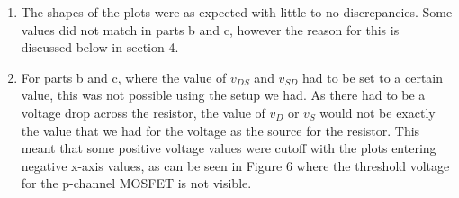 \documentclass[12pt]{article}
\begin{document}
\begin{enumerate}
    \item The shapes of the plots were as expected with little to no discrepancies. Some values did not match in parts b and c, however the reason for this is discussed below in section 4.
    \item For parts b and c, where the value of $v_{DS}$ and $v_{SD}$ had to be set to a certain value, this was not possible using the setup we had. As there had to be a voltage drop across the resistor, the value of $v_D$ or $v_S$ would not be exactly the value that we had for the voltage as the source for the resistor. This meant that some positive voltage values were cutoff with the plots entering negative x-axis values, as can be seen in Figure 6 where the threshold voltage for the p-channel MOSFET is not visible.
\end{enumerate}
\end{document}
